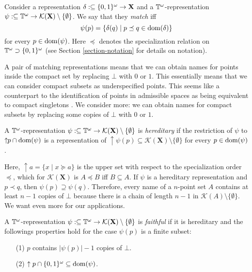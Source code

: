 \documentclass{eptcs-modified}
\begin{document}
\begin{definition}\label{def:match}
Consider a representation $\delta :\subseteq {\{0,1\}^\omega} \to \mathbf{X}$ and a $\mathbb{T}^\omega$-representation $\psi :\subseteq \mathbb{T}^\omega \to \mathcal{K}(\mathbf{X})\setminus \{\emptyset\}$. We say that they \emph{match} iff
\[
    \psi(p) = \{\delta(q) \mid p \preceq q \in \operatorname{dom}(\delta)\}
\]
for every $p \in \operatorname{dom}(\psi)$.
Here $\preceq$ denotes the specialization relation on $\mathbb{T}^\omega \supset {\{0,1\}^\omega}$
(see Section \ref{section-notation} for details on notation).
\end{definition}



A pair of matching representations means that we can obtain names for points inside the compact set by replacing $\bot$ with $0$ or $1$.
This essentially means that we can consider compact subsets as underspecified points. This seems like a counterpart to the identification of points in admissible spaces as being equivalent to compact singletons \cite{schroder5,pauly-synthetic}.
We consider more: we can obtain names for compact subsets
by replacing some copies of $\bot$ with $0$ or $1$.

\begin{definition}\label{def:hereditary}
A $\mathbb{T}^\omega$-representation $\psi :\subseteq \mathbb{T}^\omega \to \mathcal{K}(\mathbf{X}) \setminus \{\emptyset\}$ is \emph{hereditary} if the restriction of $\psi$ to $\uparrow\!\! p \cap \operatorname{dom}(\psi)$ is a
representation of $\uparrow\!\psi(p) \subseteq \mathcal{K}(\mathbf{X}) \setminus \{\emptyset\}$
for every $p \in \operatorname{dom}(\psi)$.
\end{definition}
Here,  $\uparrow\!a = \{x \mid x \succeq a\}$ is the upper set with respect to the specialization order $\preceq$,  which for $\mathcal{K}(\mathbf{X})$ is  $A \preceq B$ iff $B \subseteq A$.
If $\psi$ is a hereditary representation and $p \prec q$, then $\psi(p) \supseteq \psi(q)$.
Therefore, every name of a $n$-point set $A$ contains at least $n-1$ copies of $\bot$ because there is a chain of length $n-1$ in $\mathcal{K}(A) \setminus \{\emptyset\}$.
We want even more for our applications.
\begin{definition}\label{def:faithful}
A $\mathbb{T}^\omega$-representation $\psi :\subseteq \mathbb{T}^\omega \to \mathcal{K}(\mathbf{X}) \setminus \{\emptyset\}$ is \emph{faithful} if it is hereditary and the followings properties hold for the case $\psi(p)$ is a finite subset:
\begin{itemize}

\item[(1)] $p$ contains $|\psi(p)| - 1$ copies of $\bot$.
\item[(2)] $\uparrow p \cap \{0,1\}^\omega \subseteq \operatorname{dom}(\psi)$.
\end{itemize}
\end{definition}
\end{document}
